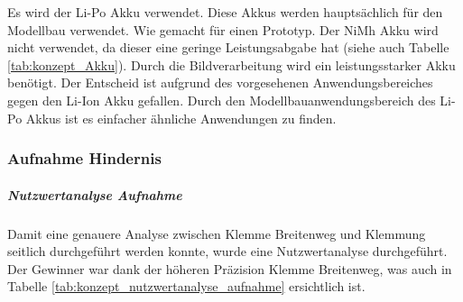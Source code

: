 \documentclass[../main.tex]{subfiles}
\begin{document}
Es wird der Li-Po Akku verwendet. Diese Akkus werden hauptsächlich für den Modellbau verwendet. Wie gemacht für einen Prototyp. Der NiMh Akku wird nicht verwendet, da dieser eine geringe Leistungsabgabe hat (siehe auch Tabelle \ref{tab:konzept_Akku}).\footnotemark
Durch die Bildverarbeitung wird ein leistungsstarker Akku benötigt. Der Entscheid ist aufgrund des vorgesehenen Anwendungsbereiches gegen den Li-Ion Akku gefallen. Durch den Modellbauanwendungsbereich des Li-Po Akkus ist es einfacher ähnliche Anwendungen zu finden.

\newpage
\subsubsection{Aufnahme Hindernis}
\subparagraph{Nutzwertanalyse Aufnahme}
        Damit eine genauere Analyse zwischen Klemme Breitenweg und Klemmung seitlich durchgeführt werden konnte, wurde eine Nutzwertanalyse durchgeführt. Der Gewinner war dank der höheren Präzision Klemme Breitenweg, was auch in Tabelle \ref{tab:konzept_nutzwertanalyse_aufnahme} ersichtlich ist.
        
\end{document}
